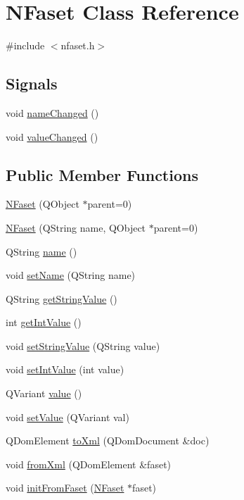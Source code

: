 \hypertarget{class_n_faset}{
\section{NFaset Class Reference}
\label{class_n_faset}
}


{\ttfamily \#include $<$nfaset.h$>$}

\subsection*{Signals}
\begin{DoxyCompactItemize}
\item 
void \hyperlink{class_n_faset_a6a4508c63e8fe17ba0d31190e16582a9}{nameChanged} ()
\item 
void \hyperlink{class_n_faset_aaf285387ac0a3f8a73af1cf1453e167e}{valueChanged} ()
\end{DoxyCompactItemize}
\subsection*{Public Member Functions}
\begin{DoxyCompactItemize}
\item 
\hyperlink{class_n_faset_a0b556468711022a5c6702786d95cc3d9}{NFaset} (QObject $\ast$parent=0)
\item 
\hyperlink{class_n_faset_aadd4b53cbd7f382ad10418ef7466fa11}{NFaset} (QString name, QObject $\ast$parent=0)
\item 
QString \hyperlink{class_n_faset_a956e7bf58e35d2ef515b3eaeb3c9bf18}{name} ()
\item 
void \hyperlink{class_n_faset_a25dec021b4d59cc02cfdc75273ad9911}{setName} (QString name)
\item 
QString \hyperlink{class_n_faset_a8d9392610342c020a2cee870882dc274}{getStringValue} ()
\item 
int \hyperlink{class_n_faset_afd3df9a8132f631d79cdb2d382c7bfc9}{getIntValue} ()
\item 
void \hyperlink{class_n_faset_ae67b6ff2bdd7c0050bffe122fe71e8fd}{setStringValue} (QString value)
\item 
void \hyperlink{class_n_faset_a39004fc1295cd6a712fcf177a01b163e}{setIntValue} (int value)
\item 
QVariant \hyperlink{class_n_faset_a85a3bdeaa670da11a85dca774996156b}{value} ()
\item 
void \hyperlink{class_n_faset_a474f01a395206bfc3da81768a294af05}{setValue} (QVariant val)
\item 
QDomElement \hyperlink{class_n_faset_af61a89aabcdb353fb8e8741fdbd8d599}{toXml} (QDomDocument \&doc)
\item 
void \hyperlink{class_n_faset_a73bcb38267c87310356bd54c89a28446}{fromXml} (QDomElement \&faset)
\item 
void \hyperlink{class_n_faset_aed8acdd56cdbe8efcda40774fdd69b8b}{initFromFaset} (\hyperlink{class_n_faset}{NFaset} $\ast$faset)
\end{DoxyCompactItemize}
